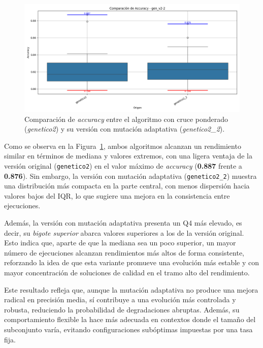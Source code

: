 \begin{figure}[htp]
    \centering
    \includegraphics[width=1\textwidth]{imagenes/evaluaciones/mutacion-adaptativa}
    \caption{Comparación de \textit{accuracy} entre el algoritmo con cruce ponderado (\textit{genetico2}) y su versión con mutación adaptativa (\textit{genetico2\_2}).}
    \label{fig:mutacion-adaptativa}
\end{figure}

Como se observa en la Figura~\ref{fig:mutacion-adaptativa}, ambos algoritmos alcanzan un rendimiento similar en términos de mediana y valores extremos,
con una ligera ventaja de la versión original (\texttt{genetico2}) en el valor máximo de \textit{accuracy} (\textbf{0.887} frente a \textbf{0.876}).
Sin embargo, la versión con mutación adaptativa (\texttt{genetico2\_2}) muestra una distribución más compacta en la parte central,
con menos dispersión hacia valores bajos del IQR, lo que sugiere una mejora en la consistencia entre ejecuciones.

Además, la versión con mutación adaptativa presenta un Q4 más elevado, es decir, su \textit{bigote superior} abarca valores superiores a los de la versión original.
Esto indica que, aparte de que la mediana sea un poco superior, un mayor número de ejecuciones alcanzan rendimientos más altos de forma consistente,
reforzando la idea de que esta variante promueve una evolución más estable y con mayor concentración de soluciones de calidad en el tramo alto del rendimiento.

Este resultado refleja que, aunque la mutación adaptativa no produce una mejora radical en precisión media,
sí contribuye a una evolución más controlada y robusta, reduciendo la probabilidad de degradaciones abruptas.
Además, su comportamiento flexible la hace más adecuada en contextos donde el tamaño del subconjunto varía,
evitando configuraciones subóptimas impuestas por una tasa fija.

